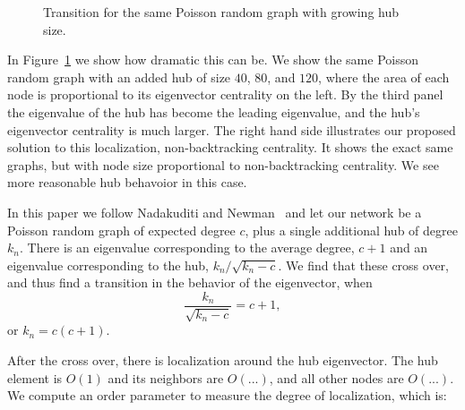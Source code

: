 \documentclass[twocolumn,prl,superscriptaddress]{revtex4}
\begin{document}
\begin{figure}
\begin{center}
\end{center}
\caption{Transition for the same Poisson random graph with growing hub size.}
\label{fig:transition}
\end{figure}

In Figure~\ref{fig:transition} we show how dramatic this can be. We show the same Poisson random graph with an added hub of size $40$, $80$, and $120$, where the area of each node is proportional to its eigenvector centrality on the left. By the third panel the eigenvalue of the hub has become the leading eigenvalue, and the hub's eigenvector centrality is much larger. The right hand side illustrates our proposed solution to this localization, non-backtracking centrality. It shows the exact same graphs, but with node size proportional to non-backtracking centrality. We see more reasonable hub behavoior in this case.

In this paper we follow Nadakuditi and Newman~\cite{nadakuditi13} and let our network be a Poisson random graph of expected degree $c$, plus a single additional hub of degree $k_n$. There is an eigenvalue corresponding to the average degree, $c+1$ and an eigenvalue corresponding to the hub, $k_n / \sqrt{k_n - c}$. We find that these cross over, and thus find a transition in the behavior of the eigenvector, when \begin{equation}\frac{k_n}{\sqrt{k_n - c}} = c+1,\end{equation} or $k_n = c(c+1)$.

After the cross over, there is localization around the hub eigenvector. The hub element is $O(1)$ and its neighbors are $O(...)$, and all other nodes are $O(...)$. We compute an order parameter to measure the degree of localization, which is:
\end{document}
